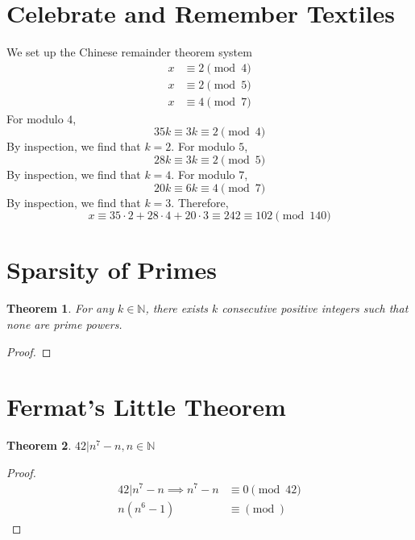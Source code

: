 \documentclass{article}
\newtheorem{theorem}{Theorem}
\newcommand{\N}{\mathbb{N}}
\begin{document}
\section{Celebrate and Remember Textiles}

We set up the Chinese remainder theorem system
\begin{align}
    x &\equiv 2 \pmod{4} \\
    x &\equiv 2 \pmod{5} \\
    x &\equiv 4 \pmod{7}
\end{align}
For modulo \(4\),
\begin{equation}
    35k \equiv 3k \equiv 2 \pmod{4}
\end{equation}
By inspection, we find that \(k = 2\).
For modulo \(5\),
\begin{equation}
    28k \equiv 3k \equiv 2 \pmod{5}
\end{equation}
By inspection, we find that \(k = 4\).
For modulo \(7\),
\begin{equation}
    20k \equiv 6k \equiv 4 \pmod{7}
\end{equation}
By inspection, we find that \(k = 3\).
Therefore,
\begin{equation}
    x \equiv 35 \cdot 2 + 28 \cdot 4 + 20 \cdot 3 \equiv 242 \equiv 102 \pmod{140}
\end{equation}

\section{Sparsity of Primes}

\begin{theorem}
    For any \(k \in \N\), there exists \(k\) consecutive positive integers such that none are prime powers.
\end{theorem}
\begin{proof}

\end{proof}

\section{Fermat's Little Theorem}

\begin{theorem}
    \(42 | n^7 - n, n \in \N\)
\end{theorem}
\begin{proof}
    \begin{align}
        42 | n^7 - n \implies n^7 - n &\equiv 0 \pmod{42} \\
        n (n^6 - 1) &\equiv \pmod{}
    \end{align}
\end{proof}
\end{document}
